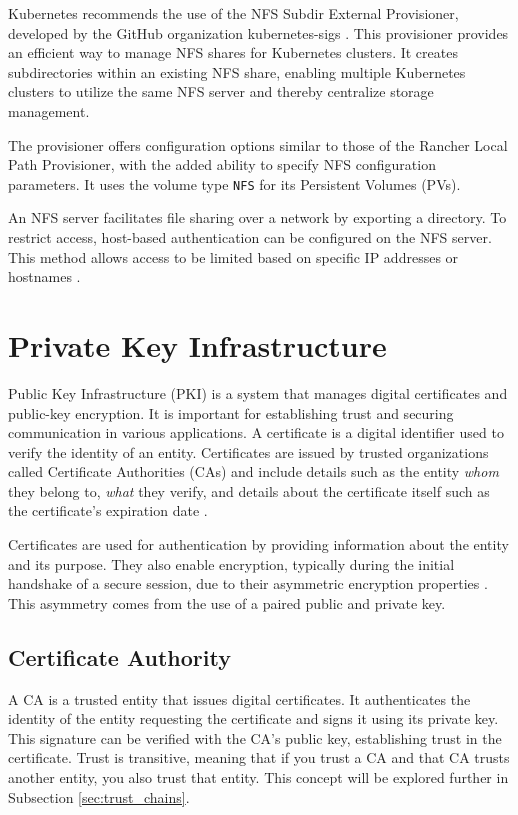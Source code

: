 Kubernetes recommends the use of the NFS Subdir External Provisioner, developed by the GitHub organization kubernetes-sigs \Parencite{kubernetes_storage_classes_nfs}. This provisioner provides an efficient way to manage NFS shares for Kubernetes clusters. It creates subdirectories within an existing NFS share, enabling multiple Kubernetes clusters to utilize the same NFS server and thereby centralize storage management.

The provisioner offers configuration options similar to those of the Rancher Local Path Provisioner, with the added ability to specify NFS configuration parameters. It uses the volume type \texttt{NFS} for its Persistent Volumes (PVs).

An NFS server facilitates file sharing over a network by exporting a directory. To restrict access, host-based authentication can be configured on the NFS server. This method allows access to be limited based on specific IP addresses or hostnames \Parencite{ubuntu_nfs_setup}.

\section{Private Key Infrastructure}

Public Key Infrastructure (PKI) is a system that manages digital certificates and public-key encryption. It is important for establishing trust and securing communication in various applications. A certificate is a digital identifier used to verify the identity of an entity. Certificates are issued by trusted organizations called Certificate Authorities (CAs) and include details such as the entity \textit{whom} they belong to, \textit{what} they verify, and details about the certificate itself such as the certificate's expiration date \Parencite{ibm_digital_certificates}.

Certificates are used for authentication by providing information about the entity and its purpose. They also enable encryption, typically during the initial handshake of a secure session, due to their asymmetric encryption properties \Parencite{cloudflare_tls_handshake}. This asymmetry comes from the use of a paired public and private key.

\subsection{Certificate Authority}
A CA is a trusted entity that issues digital certificates. It authenticates the identity of the entity requesting the certificate and signs it using its private key. This signature can be verified with the CA's public key, establishing trust in the certificate. Trust is transitive, meaning that if you trust a CA and that CA trusts another entity, you also trust that entity. This concept will be explored further in Subsection \ref{sec:trust_chains}.

